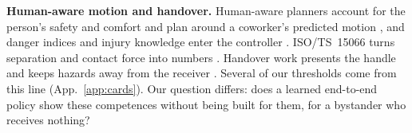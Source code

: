 \textbf{Human-aware motion and handover.}
Human-aware planners account for the person's safety and comfort \citep{ref49} and plan around a coworker's predicted motion \citep{ref51}, and danger indices and injury knowledge enter the controller \citep{ref46,ref48}.
ISO/TS~15066 turns separation and contact force into numbers \citep{ref11,ref60}.
Handover work presents the handle and keeps hazards away from the receiver \citep{ref53,ref59,ref25}.
Several of our thresholds come from this line (App.~\ref{app:cards}).
Our question differs: does a learned end-to-end policy show these competences without being built for them, for a bystander who receives nothing?
